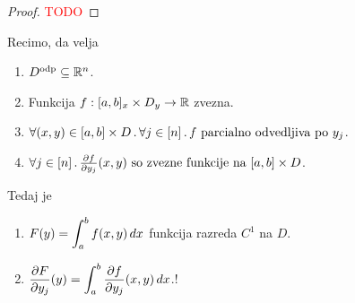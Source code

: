 \begin{proof}
    \textcolor{red}{TODO}
\end{proof}

\newpage
\begin{posledica}
    Recimo, da velja
    \begin{enumerate}
        \item $D^\text{odp} \subseteq \mathbb{R}^n$.
        \item Funkcija $f: [a,b]_x \times D_y \to \mathbb{R}$ zvezna.
        \item $\forall (x,y) \in [a,b] \times D \,.\, \forall j \in [n] \,.\, f \text{ parcialno odvedljiva po } y_j$.
        \item $\forall j \in [n] \,.\, \frac{\partial f}{\partial y_j}(x,y) \text{ so zvezne funkcije na } [a,b] \times D$.
    \end{enumerate}
    Tedaj je 
    \begin{enumerate}
        \item $\displaystyle F(y) = \int_{a}^{b} f(x,y) \, dx $ funkcija razreda $C^1$ na $D$.
        \item $\displaystyle \frac{\partial F}{\partial y_j}(y) = \int_{a}^{b} \frac{\partial f}{\partial y_j}(x,y) \, dx$.!
    \end{enumerate}
    
\end{posledica}